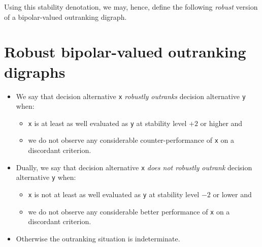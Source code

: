 Using this stability denotation, we may, hence, define the following \emph{robust} version of a bipolar-valued outranking digraph.

\section{Robust bipolar-valued outranking digraphs}
\label{sec:19.4}

\begin{definition}\label{def:19.1}
\begin{itemize}
\item We say that decision alternative \texttt{x} \emph{robustly outranks} decision alternative \texttt{y} when:
\begin{itemize}[nosep]
\item \texttt{x} is at least as well evaluated as \texttt{y} at stability level $+2$ or higher and
\item we do not observe any considerable counter-performance of \texttt{x} on a discordant criterion.
\end{itemize}
\item Dually, we say that decision alternative \texttt{x} \emph{does not robustly outrank} decision alternative \texttt{y} when:
\begin{itemize}[nosep]
\item \texttt{x} is not at least as well evaluated as \texttt{y} at stability level $-2$ or lower and
\item we do not observe any considerable better performance of \texttt{x} on a discordant criterion.
\end{itemize}
\item Otherwise the outranking situation is indeterminate.
\end{itemize}
\end{definition}

